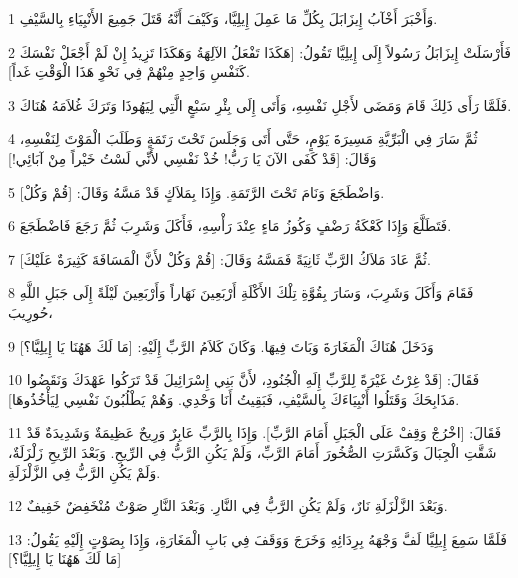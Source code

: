 \par 1 وَأَخْبَرَ أَخْآبُ إِيزَابَلَ بِكُلِّ مَا عَمِلَ إِيلِيَّا، وَكَيْفَ أَنَّهُ قَتَلَ جَمِيعَ الأَنْبِيَاءِ بِالسَّيْفِ.
\par 2 فَأَرْسَلَتْ إِيزَابَلُ رَسُولاً إِلَى إِيلِيَّا تَقُولُ: [هَكَذَا تَفْعَلُ الآلِهَةُ وَهَكَذَا تَزِيدُ إِنْ لَمْ أَجْعَلْ نَفْسَكَ كَنَفْسِ وَاحِدٍ مِنْهُمْ فِي نَحْوِ هَذَا الْوَقْتِ غَداً].
\par 3 فَلَمَّا رَأَى ذَلِكَ قَامَ وَمَضَى لأَجْلِ نَفْسِهِ، وَأَتَى إِلَى بِئْرِ سَبْعٍ الَّتِي لِيَهُوذَا وَتَرَكَ غُلاَمَهُ هُنَاكَ.
\par 4 ثُمَّ سَارَ فِي الْبَرِّيَّةِ مَسِيرَةَ يَوْمٍ، حَتَّى أَتَى وَجَلَسَ تَحْتَ رَتَمَةٍ وَطَلَبَ الْمَوْتَ لِنَفْسِهِ، وَقَالَ: [قَدْ كَفَى الآنَ يَا رَبُّ! خُذْ نَفْسِي لأَنِّي لَسْتُ خَيْراً مِنْ آبَائِي!]
\par 5 وَاضْطَجَعَ وَنَامَ تَحْتَ الرَّتَمَةِ. وَإِذَا بِمَلاَكٍ قَدْ مَسَّهُ وَقَالَ: [قُمْ وَكُلْ].
\par 6 فَتَطَلَّعَ وَإِذَا كَعْكَةُ رَضْفٍ وَكُوزُ مَاءٍ عِنْدَ رَأْسِهِ، فَأَكَلَ وَشَرِبَ ثُمَّ رَجَعَ فَاضْطَجَعَ.
\par 7 ثُمَّ عَادَ مَلاَكُ الرَّبِّ ثَانِيَةً فَمَسَّهُ وَقَالَ: [قُمْ وَكُلْ لأَنَّ الْمَسَافَةَ كَثِيرَةٌ عَلَيْكَ].
\par 8 فَقَامَ وَأَكَلَ وَشَرِبَ، وَسَارَ بِقُوَّةِ تِلْكَ الأَكْلَةِ أَرْبَعِينَ نَهَاراً وَأَرْبَعِينَ لَيْلَةً إِلَى جَبَلِ اللَّهِ حُورِيبَ،
\par 9 وَدَخَلَ هُنَاكَ الْمَغَارَةَ وَبَاتَ فِيهَا. وَكَانَ كَلاَمُ الرَّبِّ إِلَيْهِ: [مَا لَكَ هَهُنَا يَا إِيلِيَّا؟]
\par 10 فَقَالَ: [قَدْ غِرْتُ غَيْرَةً لِلرَّبِّ إِلَهِ الْجُنُودِ، لأَنَّ بَنِي إِسْرَائِيلَ قَدْ تَرَكُوا عَهْدَكَ وَنَقَضُوا مَذَابِحَكَ وَقَتَلُوا أَنْبِيَاءَكَ بِالسَّيْفِ، فَبَقِيتُ أَنَا وَحْدِي. وَهُمْ يَطْلُبُونَ نَفْسِي لِيَأْخُذُوهَا].
\par 11 فَقَالَ: [اخْرُجْ وَقِفْ عَلَى الْجَبَلِ أَمَامَ الرَّبِّ]. وَإِذَا بِالرَّبِّ عَابِرٌ وَرِيحٌ عَظِيمَةٌ وَشَدِيدَةٌ قَدْ شَقَّتِ الْجِبَالَ وَكَسَّرَتِ الصُّخُورَ أَمَامَ الرَّبِّ، وَلَمْ يَكُنِ الرَّبُّ فِي الرِّيحِ. وَبَعْدَ الرِّيحِ زَلْزَلَةٌ، وَلَمْ يَكُنِ الرَّبُّ فِي الزَّلْزَلَةِ.
\par 12 وَبَعْدَ الزَّلْزَلَةِ نَارٌ، وَلَمْ يَكُنِ الرَّبُّ فِي النَّارِ. وَبَعْدَ النَّارِ صَوْتٌ مُنْخَفِضٌ خَفِيفٌ.
\par 13 فَلَمَّا سَمِعَ إِيلِيَّا لَفَّ وَجْهَهُ بِرِدَائِهِ وَخَرَجَ وَوَقَفَ فِي بَابِ الْمَغَارَةِ، وَإِذَا بِصَوْتٍ إِلَيْهِ يَقُولُ: [مَا لَكَ هَهُنَا يَا إِيلِيَّا؟]
